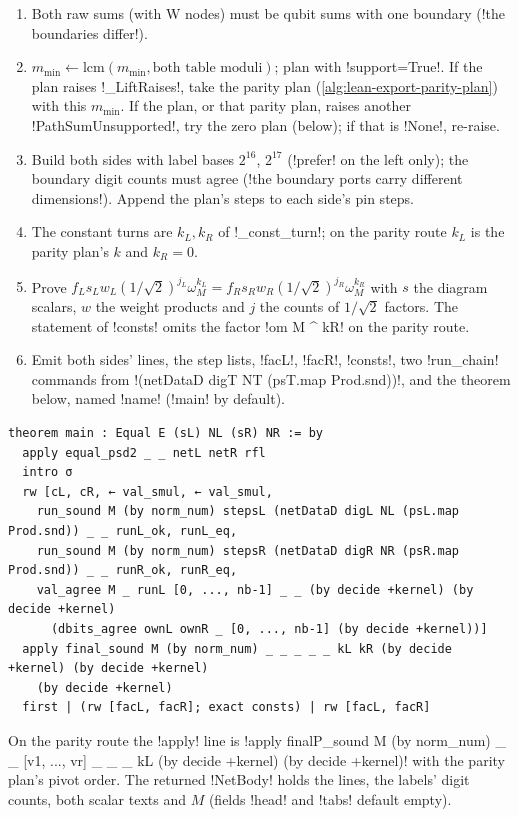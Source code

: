 {{{\begin{algorithm}\label{alg:lean-export-net-body}
\begin{enumerate}
\item Both raw sums (with W nodes) must be qubit sums with one boundary
(\lexcode!the boundaries differ!).
\item $m_{\min} \gets \mathrm{lcm}(m_{\min}, \text{both table moduli})$; plan with
\lexpy!support=True!. If the plan raises \lexpy!_LiftRaises!, take the parity plan
(\cref{alg:lean-export-parity-plan}) with this $m_{\min}$. If the plan, or that parity plan,
raises another \lexpy!PathSumUnsupported!, try the zero plan (below); if that is \lexpy!None!,
re-raise.
\item Build both sides with label bases $2^{16}$, $2^{17}$ (\lexcode!prefer! on the left only);
the boundary digit counts must agree (\lexcode!the boundary ports carry different dimensions!).
Append the plan's steps to each side's pin steps.
\item The constant turns are $k_L, k_R$ of \lexpy!_const_turn!; on the parity route $k_L$ is the
parity plan's $k$ and $k_R = 0$.
\item Prove $f_L s_L w_L (1/\sqrt2)^{j_L}\omega_M^{k_L} = f_R s_R w_R
(1/\sqrt2)^{j_R}\omega_M^{k_R}$ with $s$ the diagram scalars, $w$ the weight products and $j$
the counts of $1/\sqrt2$ factors. The statement of \lexlean!consts! omits the factor
\lexlean!om M ^ kR! on the parity route.
\item Emit both sides' lines, the step lists, \lexlean!facL!, \lexlean!facR!, \lexlean!consts!, two
\lexlean!run_chain! commands from \lexlean!(netDataD digT NT (psT.map Prod.snd))!, and the theorem
below, named \lexcode!name! (\lexcode!main! by default).
\end{enumerate}
\end{algorithm}
\begin{lstlisting}[style=lexlean]
theorem main : Equal E (sL) NL (sR) NR := by
  apply equal_psd2 _ _ netL netR rfl
  intro σ
  rw [cL, cR, ← val_smul, ← val_smul,
    run_sound M (by norm_num) stepsL (netDataD digL NL (psL.map Prod.snd)) _ _ runL_ok, runL_eq,
    run_sound M (by norm_num) stepsR (netDataD digR NR (psR.map Prod.snd)) _ _ runR_ok, runR_eq,
    val_agree M _ runL [0, ..., nb-1] _ _ (by decide +kernel) (by decide +kernel)
      (dbits_agree ownL ownR _ [0, ..., nb-1] (by decide +kernel))]
  apply final_sound M (by norm_num) _ _ _ _ _ kL kR (by decide +kernel) (by decide +kernel)
    (by decide +kernel)
  first | (rw [facL, facR]; exact consts) | rw [facL, facR]
\end{lstlisting}
On the parity route the \lexlean!apply! line is
\lexlean!apply finalP_sound M (by norm_num) _ _ [v1, ..., vr] _ _ _ kL (by decide +kernel) (by decide +kernel)!
with the parity plan's pivot order.
The returned \lexpy!NetBody! holds the lines, the labels' digit counts, both scalar texts and $M$
(fields \lexpy!head! and \lexpy!tabs! default empty).

}}}
